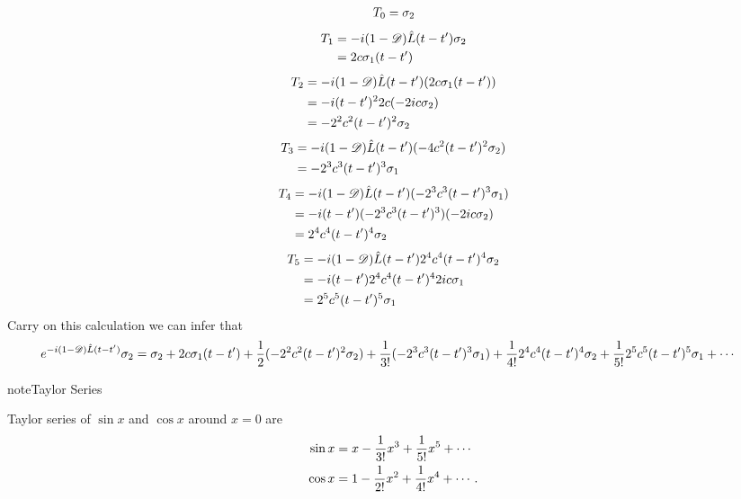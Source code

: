 \documentclass[letterpaper,12pt,english]{sphinxmanual}
\begin{document}
\begin{gather}
\begin{split}T_0 = \sigma_2\end{split}\notag
\end{gather}\begin{gather}
\begin{split}T_1 &= -i(1-\mathscr D)\hat L (t-t') \sigma_2 \\
& = 2c\sigma_1 (t-t')\end{split}\notag
\end{gather}\begin{gather}
\begin{split}T_2 & = -i(1-\mathscr D)\hat L (t-t') (2c\sigma_1 (t-t')) \\
& = -i(t-t')^2 2c(-2ic\sigma_2) \\
& = - 2^2 c^2 (t-t')^2 \sigma_2\end{split}\notag
\end{gather}\begin{gather}
\begin{split}T_3 & = -i(1-\mathscr D)\hat L (t-t') (- 4c^2 (t-t')^2 \sigma_2) \\
& = -2^3c^3(t-t')^3\sigma_1\end{split}\notag
\end{gather}\begin{gather}
\begin{split}T_4 & = -i(1-\mathscr D)\hat L (t-t') (-2^3c^3(t-t')^3\sigma_1) \\
& = -i (t-t') (-2^3 c^3(t-t')^3) (-2ic\sigma_2) \\
& = 2^4 c^4 (t-t')^4 \sigma_2\end{split}\notag
\end{gather}\begin{gather}
\begin{split}T_5 & = -i(1-\mathscr D)\hat L (t-t') 2^4 c^4 (t-t')^4 \sigma_2 \\
& = -i(t-t')2^4 c^4 (t-t')^4 2ic\sigma_1 \\
& = 2^5c^5 (t-t')^5 \sigma_1\end{split}\notag
\end{gather}
Carry on this calculation we can infer that
\begin{gather}
\begin{split}e^{-i(1-\mathscr D)\hat L (t-t')} \sigma_2 &= \sigma_2 + 2c\sigma_1 (t-t') + \frac{1}{2}(- 2^2 c^2 (t-t')^2 \sigma_2) +  \frac{1}{3!}(-2^3c^3(t-t')^3\sigma_1) + \frac{1}{4!} 2^4 c^4 (t-t')^4 \sigma_2  + \frac{1}{5!} 2^5c^5 (t-t')^5 \sigma_1 +  \cdots\end{split}\notag
\end{gather}
\begin{notice}{note}{Taylor Series}

Taylor series of \(\sin x\) and \(\cos x\) around \(x=0\) are
\begin{gather}
\begin{split}\sin x &= x - \frac{1}{3!} x^3 + \frac{1}{5!}x^5 + \cdots \\
\cos x & = 1 -\frac{1}{2!} x^2 + \frac{1}{4!} x^4 + \cdots .\end{split}\notag
\end{gather}\end{notice}
\end{document}
